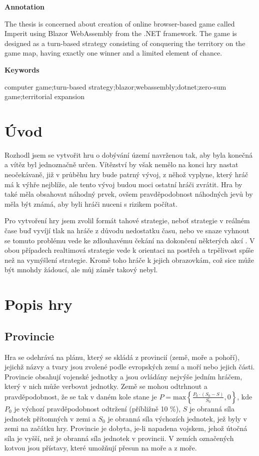 \documentclass[a4paper,12pt]{article}
\def\max #1{\textrm{max}\left\{#1\right\}}
\begin{document}
\Large\textbf{Annotation}\normalsize

The thesis is concerned about creation of online browser-based game called Imperit using Blazor WebAssembly from the .NET framework. The game is designed as a turn-based strategy consisting of conquering the territory on the game map, having exactly one winner and a limited element of chance.

\Large\textbf{Keywords}\normalsize

computer game;turn-based strategy;blazor;webassembly;dotnet;zero-sum game;territorial expansion
\newpage
\thispagestyle{empty}
\tableofcontents
\newpage
\section{Úvod}
Rozhodl jsem se vytvořit hru o dobývání území navrženou tak, aby byla konečná a vítěz byl jednoznačně určen. Vítězství by však nemělo na konci hry nastat neočekávaně, již v průběhu hry bude patrný vývoj, z něhož vyplyne, který hráč má k výhře nejblíže, ale tento vývoj budou moci ostatní hráči zvrátit. Hra by také měla obsahovat náhodný prvek, ovšem pravděpodobnost náhodných jevů by měla být známá, aby byli hráči nuceni s rizikem počítat.

Pro vytvoření hry jsem zvolil formát tahové strategie, neboť strategie v reálném čase buď vyvíjí tlak na hráče z důvodu nedostatku času, nebo ve snaze vyhnout se tomuto problému vede ke zdlouhavému čekání na dokončení některých akcí \cite{turnreal1}. V obou případech realtimová strategie vede k orientaci na postřeh a trpělivost spíše než na vymýšlení strategie\cite{turnreal2}. Kromě toho  hráče k jejich obrazovkám, což sice může být mnohdy žádoucí, ale můj záměr takový nebyl.

\section{Popis hry}
\subsection{Provincie}
Hra se odehrává na plánu, který se skládá z provincií (země, moře a pohoří), jejichž názvy a tvary jsou zvolené podle evropských zemí a moří nebo jejich části. Provincie obsahují vojenské jednotky a jsou ovládány nejvýše jedním hráčem, který v nich může verbovat jednotky. Země se mohou odtrhnout a pravděpodobnost, že se tak v daném kole stane je $P=\max{\displaystyle\frac{P_0\cdot (S_0-S)}{S_0},0}$, kde $P_0$ je výchozí pravděpodobnost odtržení (příbližně 10 \%), $S$ je obranná síla jednotek přítomných v zemi a $S_0$ je obranná síla výchozích jednotek, jež byly v zemi na začátku hry. Provincie je dobyta, je-li napadena vojskem, jehož útočná síla je vyšší, než je obranná síla jednotek v provincii. V zemích označených kotvou jsou přístavy, které umožňují přesun na moře a z moře.
\end{document}
